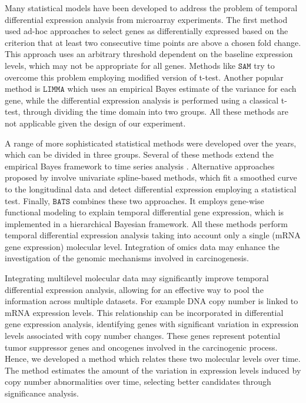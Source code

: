 Many statistical models have been developed to address the problem of temporal differential expression analysis from microarray experiments. The first method \cite{Nau2002, Shapira2009} used ad-hoc approaches to select genes as differentially expressed based on the criterion that at least two consecutive time points are above a chosen fold change. This approach uses an arbitrary threshold dependent on the baseline expression levels, which may not be appropriate for all genes. Methods like $\texttt{SAM}$ \cite{Tusher2001} try to overcome this problem employing modified version of t-test. Another popular method is $\texttt{LIMMA}$ \cite{Smyth2004} which uses an empirical Bayes estimate of the variance for each gene, while the differential expression analysis is performed using a classical t-test, through dividing the time domain into two groups. All these methods are not applicable given the design of our experiment.

A range of more sophisticated statistical methods were developed over the years, which can be divided in three groups. Several of these methods extend the empirical Bayes framework to time series analysis \cite{Efron2001, Lonnstedt2002, Eckel2004, Tai2006}. Alternative approaches proposed by \cite{BarJoseph2003, Storey2005, Hong2006} involve univariate spline-based methods, which fit a smoothed curve to the longitudinal data and detect differential expression employing a statistical test. Finally, $\texttt{BATS}$ combines these two approaches. It employs gene-wise functional modeling to explain temporal differential gene expression, which is implemented in a hierarchical Bayesian framework. All these methods perform temporal differential expression analysis taking into account only a single (mRNA gene expression) molecular level. Integration of omics data may enhance the investigation of the genomic mechanisms involved in carcinogenesis.

Integrating multilevel molecular data may significantly improve temporal differential expression analysis, allowing for an effective way to pool the information across multiple datasets. For example DNA copy number is linked to mRNA expression levels. This relationship can be incorporated in differential gene expression analysis, identifying genes with significant variation in expression levels associated with copy number changes. These genes represent potential tumor suppressor genes and oncogenes involved in the carcinogenic process. Hence, we developed a method which relates these two molecular levels over time. The method estimates the amount of the variation in expression levels induced by copy number abnormalities over time, selecting better candidates through significance analysis.

